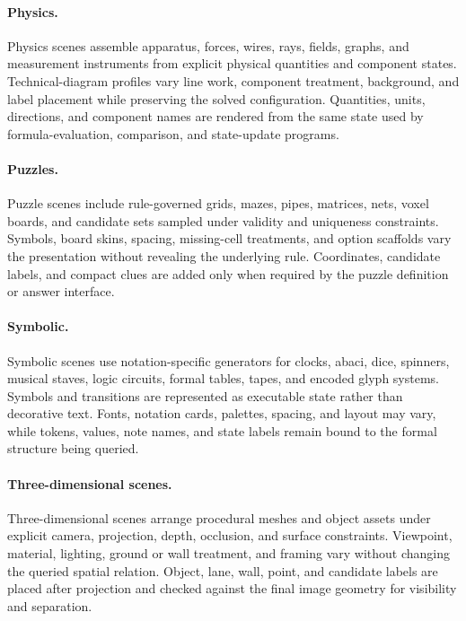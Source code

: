 \paragraph{Physics.}
Physics scenes assemble apparatus, forces, wires, rays, fields, graphs, and
measurement instruments from explicit physical quantities and component
states. Technical-diagram profiles vary line work, component treatment,
background, and label placement while preserving the solved configuration.
Quantities, units, directions, and component names are rendered from the same
state used by formula-evaluation, comparison, and state-update programs.

\paragraph{Puzzles.}
Puzzle scenes include rule-governed grids, mazes, pipes, matrices, nets, voxel
boards, and candidate sets sampled under validity and uniqueness constraints.
Symbols, board skins, spacing, missing-cell treatments, and option scaffolds
vary the presentation without revealing the underlying rule. Coordinates,
candidate labels, and compact clues are added only when required by the puzzle
definition or answer interface.

\paragraph{Symbolic.}
Symbolic scenes use notation-specific generators for clocks, abaci, dice,
spinners, musical staves, logic circuits, formal tables, tapes, and encoded
glyph systems. Symbols and transitions are represented as executable state
rather than decorative text. Fonts, notation cards, palettes, spacing, and
layout may vary, while tokens, values, note names, and state labels remain
bound to the formal structure being queried.

\paragraph{Three-dimensional scenes.}
Three-dimensional scenes arrange procedural meshes and object assets under
explicit camera, projection, depth, occlusion, and surface constraints.
Viewpoint, material, lighting, ground or wall treatment, and framing vary
without changing the queried spatial relation. Object, lane, wall, point, and
candidate labels are placed after projection and checked against the final
image geometry for visibility and separation.


